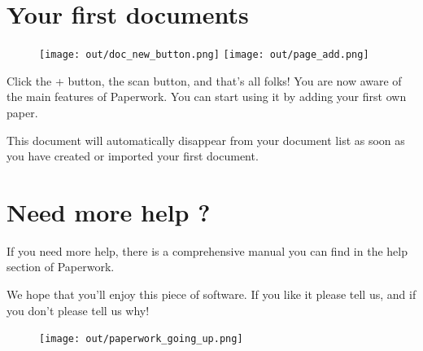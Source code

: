 \documentclass[10pt,a4paper]{article}
\begin{document}
\section{Your first documents}

\begin{figure}[h]
	\centering
	\texttt{[image: out/doc\_new\_button.png]}
	\texttt{[image: out/page\_add.png]}
\end{figure}

Click the + button, the scan button, and that's all folks! You are now aware
of the main features of Paperwork. You can start using it by adding your first
own paper.

This document will automatically disappear from your document list as soon
as you have created or imported your first document.


\section{Need more help ?}

\begin{figure}[H]
	\centering
\end{figure}

If you need more help, there is a comprehensive manual you can find in the help
section of Paperwork.

We hope that you'll enjoy this piece of software. If you like it please tell
us, and if you don't please tell us why!

\begin{figure}[b]
	\texttt{[image: out/paperwork\_going\_up.png]}
\end{figure}
\end{document}
